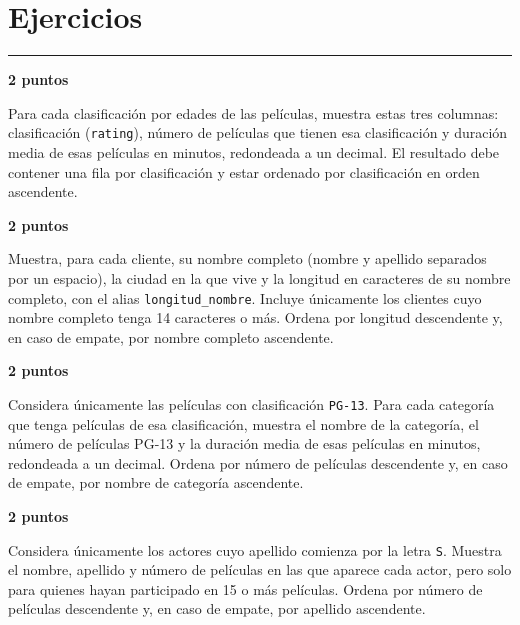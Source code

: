 \documentclass[11pt,a4paper]{article}
\begin{document}
\section*{Ejercicios}\vspace{-3mm}\color{LBcereza}\rule{\textwidth}{0.5pt}\color{LBtexto}
\par\medskip{}\hfill{\color{LBcereza}\bfseries 2 puntos}\par\smallskip
Para cada clasificación por edades de las películas, muestra estas tres columnas: clasificación (\texttt{rating}), número de películas que tienen esa clasificación y duración media de esas películas en minutos, redondeada a un decimal. El resultado debe contener una fila por clasificación y estar ordenado por clasificación en orden ascendente.\par\medskip
{}
\par\medskip{}\hfill{\color{LBcereza}\bfseries 2 puntos}\par\smallskip
Muestra, para cada cliente, su nombre completo (nombre y apellido separados por un espacio), la ciudad en la que vive y la longitud en caracteres de su nombre completo, con el alias \texttt{longitud\_nombre}. Incluye únicamente los clientes cuyo nombre completo tenga 14 caracteres o más. Ordena por longitud descendente y, en caso de empate, por nombre completo ascendente.\par\medskip
{}
\par\medskip{}\hfill{\color{LBcereza}\bfseries 2 puntos}\par\smallskip
Considera únicamente las películas con clasificación \texttt{PG-13}. Para cada categoría que tenga películas de esa clasificación, muestra el nombre de la categoría, el número de películas PG-13 y la duración media de esas películas en minutos, redondeada a un decimal. Ordena por número de películas descendente y, en caso de empate, por nombre de categoría ascendente.\par\medskip
\newpage
{}
\par\medskip{}\hfill{\color{LBcereza}\bfseries 2 puntos}\par\smallskip
Considera únicamente los actores cuyo apellido comienza por la letra \texttt{S}. Muestra el nombre, apellido y número de películas en las que aparece cada actor, pero solo para quienes hayan participado en 15 o más películas. Ordena por número de películas descendente y, en caso de empate, por apellido ascendente.\par\medskip
\end{document}
